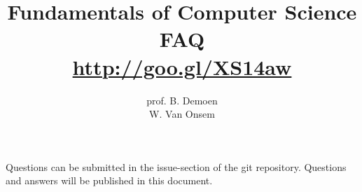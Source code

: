 \documentclass{article}
\title{Fundamentals of Computer Science\\FAQ\\\url{http://goo.gl/XS14aw}}
\author{prof. B. Demoen\\W. Van Onsem}
\date{}
\begin{document}
\maketitle
Questions can be submitted in the issue-section of the git repository. Questions and answers will be published in this document.
\end{document}
